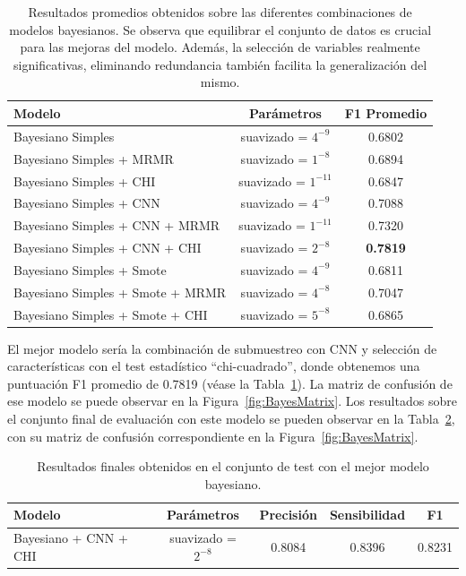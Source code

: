 \documentclass[12pt,letterpaper]{article}
\begin{document}
\begin{table}[!ht]
    \centering
    \begin{tabular}{lcc}
        \hline
        \textbf{Modelo} & \textbf{Parámetros} &\textbf{F1 Promedio} \\\hline
        Bayesiano Simples & suavizado = $4^{-9}$ & 0.6802 \\ 
        Bayesiano Simples + MRMR & suavizado = $1^{-8}$ & 0.6894 \\ 
        Bayesiano Simples + CHI & suavizado = $1^{-11}$ & 0.6847 \\ 
        Bayesiano Simples + CNN & suavizado = $4^{-9}$ & 0.7088\\ 
        Bayesiano Simples + CNN + MRMR & suavizado = $1^{-11}$ & 0.7320 \\ 
        Bayesiano Simples + CNN + CHI & suavizado = $2^{-8}$ & \textbf{0.7819} \\ 
        Bayesiano Simples + Smote & suavizado = $4^{-9}$ & 0.6811 \\ 
        Bayesiano Simples + Smote + MRMR & suavizado = $4^{-8}$ & 0.7047 \\ 
        Bayesiano Simples + Smote + CHI & suavizado = $5^{-8}$ & 0.6865 \\ 
        \hline
    \end{tabular}
    \caption{Resultados promedios obtenidos sobre las diferentes combinaciones de modelos bayesianos. Se observa que equilibrar el conjunto de datos es crucial para las mejoras del modelo. Además, la selección de variables realmente significativas, eliminando redundancia también facilita la generalización del mismo. }
    \label{tab:BayesResults}
\end{table}
El mejor modelo sería la combinación de submuestreo con CNN y selección de características con el test estadístico ``chi-cuadrado'', donde obtenemos una puntuación F1 promedio de 0.7819 (véase la Tabla~\ref{tab:BayesResults}).
La matriz de confusión de ese modelo se puede observar en la Figura~\ref{fig:BayesMatrix}. Los resultados sobre el conjunto final de evaluación con este modelo se pueden observar en la Tabla~\ref{tab:BayesFinalResults}, con su matriz de confusión correspondiente en la Figura~\ref{fig:BayesMatrix}.


\begin{table}[!ht]
    \centering
    \begin{tabular}{lcccc}
        \hline
        \textbf{Modelo} & \textbf{Parámetros} &\textbf{Precisión} &\textbf{Sensibilidad} &\textbf{F1} \\\hline
        Bayesiano + CNN + CHI & suavizado = $2^{-8}$ & 0.8084 & 0.8396 & 0.8231\\ 
        \hline
    \end{tabular}
    \caption{Resultados finales obtenidos en el conjunto de test con el mejor modelo bayesiano.}
    \label{tab:BayesFinalResults}
\end{table}
\end{document}
